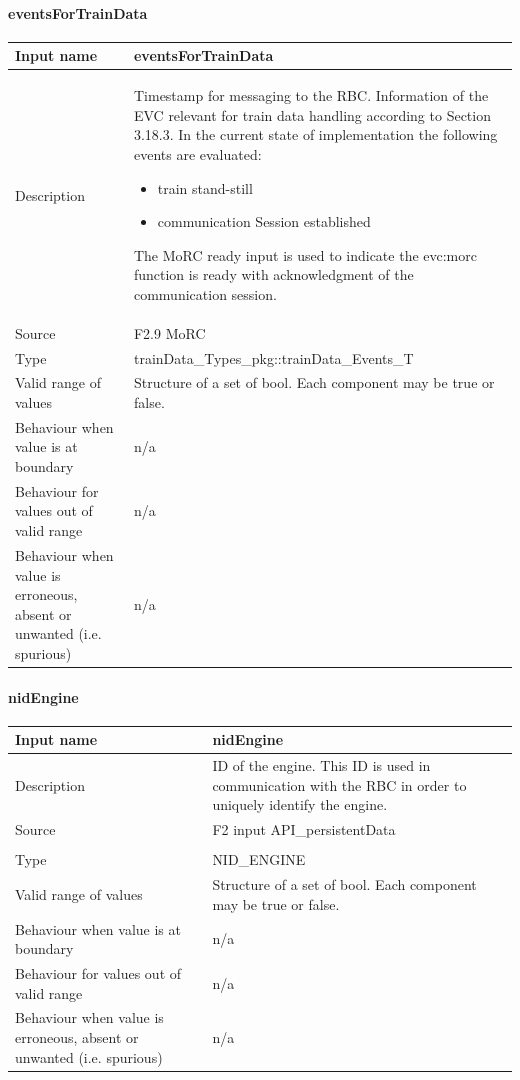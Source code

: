\paragraph{eventsForTrainData}

\begin{longtable}{p{}p{}}
\toprule
Input name				& eventsForTrainData\\
\midrule
Description				& Timestamp for messaging to the RBC. Information of the EVC relevant for train data handling according to Section 3.18.3. In the current state of implementation the following events are evaluated:
\begin{itemize}
\item train stand-still
\item communication Session established
\end{itemize}
The MoRC ready input is used to indicate the evc:morc function is ready with acknowledgment of the communication session.\\
\midrule
Source					& F2.9 MoRC\\ 
\midrule
Type						& trainData\_Types\_pkg::trainData\_Events\_T\\
\midrule
Valid range of values	& Structure of a set of bool. Each component may be true or false.\\
\midrule
Behaviour when value is at boundary	& n/a\\
\midrule
Behaviour for values out of valid range	& n/a\\
\midrule
Behaviour when value is erroneous, absent or unwanted (i.e. spurious) & n/a\\

\bottomrule
\end{longtable}

\paragraph{nidEngine}

\begin{longtable}{p{}p{}}
\toprule
Input name				& nidEngine\\
\midrule
Description				& ID of the engine. This ID is used in communication with the RBC in order to uniquely identify the engine.\\
\midrule
Source					& F2 input API\_persistentData\\ 
\\ 
\midrule
Type					& NID\_ENGINE\\
\midrule
Valid range of values	& Structure of a set of bool. Each component may be true or false.\\
\midrule
Behaviour when value is at boundary	& n/a\\
\midrule
Behaviour for values out of valid range	& n/a\\
\midrule
Behaviour when value is erroneous, absent or unwanted (i.e. spurious) & n/a\\

\bottomrule
\end{longtable}
